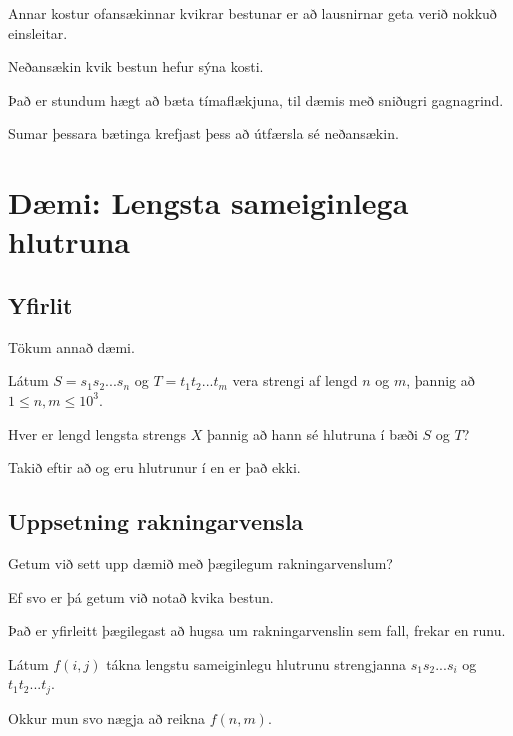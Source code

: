 {
    {
        \item<1-> Annar kostur ofansækinnar kvikrar bestunar er að lausnirnar geta verið nokkuð einsleitar.
        \item<2->[] 
    }
}

{
    {
        \item<1-> Neðansækin kvik bestun hefur sýna kosti.
        \item<2-> Það er stundum hægt að bæta tímaflækjuna, til dæmis með sniðugri gagnagrind.
        \item<3-> Sumar þessara bætinga krefjast þess að útfærsla sé neðansækin.
    }
}

\section{Dæmi: Lengsta sameiginlega hlutruna}
\subsection{Yfirlit}
{
    {
        \item<1-> Tökum annað dæmi.
        \item<2-> Látum $S = s_1s_2...s_n$ og $T = t_1t_2...t_m$ vera strengi af lengd $n$ og $m$, þannig að $1 \leq n, m \leq 10^3$.
        \item<3-> Hver er lengd lengsta strengs $X$ þannig að hann sé hlutruna í bæði $S$ og $T$?
        \item<4-> Takið eftir að  og  eru hlutrunur í  en  er það ekki.
    }
}

\subsection{Uppsetning rakningarvensla}
{
    {
        \item<1-> Getum við sett upp dæmið með þægilegum rakningarvenslum?
        \item<2-> Ef svo er þá getum við notað kvika bestun.
        \item<3-> Það er yfirleitt þægilegast að hugsa um rakningarvenslin sem fall, frekar en runu.
        \item<4-> Látum $f(i, j)$ tákna lengstu sameiginlegu hlutrunu strengjanna $s_1s_2...s_i$ og $t_1t_2...t_j$.
        \item<5-> Okkur mun svo nægja að reikna $f(n, m)$.
    }
}

